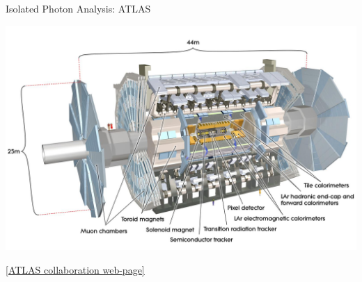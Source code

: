 \documentclass[aspectratio=169,10pt]{beamer}
\begin{document}
  \begin{frame}{Isolated Photon Analysis: ATLAS}
    \begin{center}
      \includegraphics[height=0.85\textheight]{EMLectureWeek2018/atlas.jpg}
    \end{center}    
    \vspace{-0.5cm}\tiny \href{https://atlas.cern/discover/detector}{[ATLAS collaboration web-page]}
  \end{frame}
  
\end{document}
